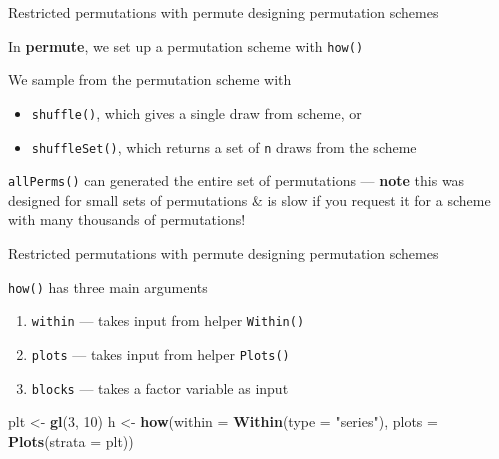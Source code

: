 \documentclass[10pt,ignorenonframetext,compress, aspectratio=169]{beamer}
\newenvironment{Shaded}{\begin{snugshade}}{\end{snugshade}}
\newcommand{\KeywordTok}[1]{\textcolor[rgb]{0.13,0.29,0.53}{\textbf{{#1}}}}
\newcommand{\DataTypeTok}[1]{\textcolor[rgb]{0.13,0.29,0.53}{{#1}}}
\newcommand{\DecValTok}[1]{\textcolor[rgb]{0.00,0.00,0.81}{{#1}}}
\newcommand{\StringTok}[1]{\textcolor[rgb]{0.31,0.60,0.02}{{#1}}}
\newcommand{\NormalTok}[1]{{#1}}
\begin{document}
\begin{frame}{Restricted permutations with permute \textbar{} designing
permutation schemes}

In \textbf{permute}, we set up a permutation scheme with \texttt{how()}

We sample from the permutation scheme with

\begin{itemize}
\itemsep1pt\parskip0pt
\item
  \texttt{shuffle()}, which gives a single draw from scheme, or
\item
  \texttt{shuffleSet()}, which returns a set of \texttt{n} draws from
  the scheme
\end{itemize}

\texttt{allPerms()} can generated the entire set of permutations ---
\textbf{note} this was designed for small sets of permutations \& is
slow if you request it for a scheme with many thousands of permutations!

\end{frame}

\begin{frame}[fragile]{Restricted permutations with permute \textbar{}
designing permutation schemes}

\texttt{how()} has three main arguments

\begin{enumerate}
\def\labelenumi{\arabic{enumi}.}
\itemsep1pt\parskip0pt
\item
  \texttt{within} --- takes input from helper \texttt{Within()}
\item
  \texttt{plots} --- takes input from helper \texttt{Plots()}
\item
  \texttt{blocks} --- takes a factor variable as input
\end{enumerate}

\scriptsize

\begin{Shaded}
\begin{Highlighting}[]
\NormalTok{plt <-}\StringTok{ }\KeywordTok{gl}\NormalTok{(}\DecValTok{3}\NormalTok{, }\DecValTok{10}\NormalTok{)}
\NormalTok{h <-}\StringTok{ }\KeywordTok{how}\NormalTok{(}\DataTypeTok{within =} \KeywordTok{Within}\NormalTok{(}\DataTypeTok{type =} \StringTok{"series"}\NormalTok{), }\DataTypeTok{plots =} \KeywordTok{Plots}\NormalTok{(}\DataTypeTok{strata =} \NormalTok{plt))}
\end{Highlighting}
\end{Shaded}

\normalsize

\end{frame}
\end{document}
